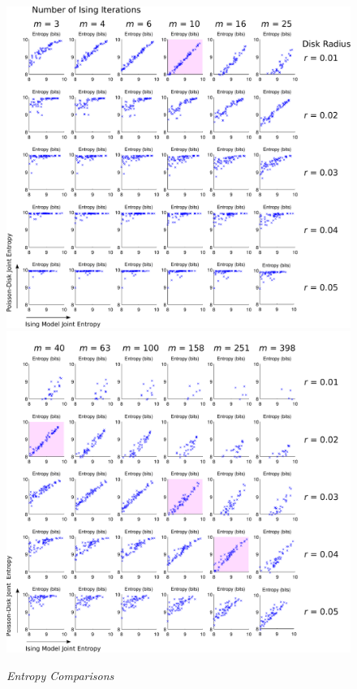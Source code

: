 \begin{figure}
 \centering
 \includegraphics[scale=0.4]{media/left_combos_hilite} 
 \includegraphics[scale=0.4]{media/right_combos_hilite}
 \caption{\emph{Entropy Comparisons}\label{fig:comparisons}}
\end{figure}

